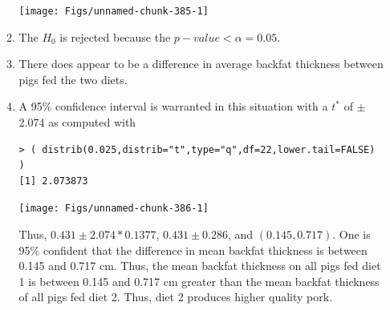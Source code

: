 \documentclass[10pt,openany]{book}\usepackage[]{graphicx}\usepackage[]{color}
\makeatletter
\newenvironment{kframe}{%
 \def\at@end@of@kframe{}%
 \ifinner\ifhmode%
  \def\at@end@of@kframe{\end{minipage}}%
  \begin{minipage}{\columnwidth}%
 \fi\fi%
 \def\FrameCommand##1{\hskip\@totalleftmargin \hskip-\fboxsep
 \colorbox{shadecolor}{##1}\hskip-\fboxsep
     \hskip-\linewidth \hskip-\@totalleftmargin \hskip\columnwidth}%
 \MakeFramed {\advance\hsize-\width
   \@totalleftmargin\z@ \linewidth\hsize
   \@setminipage}}%
 {\par\unskip\endMakeFramed%
 \at@end@of@kframe}
\newenvironment{knitrout}{}{} %
\makeatother
\begin{document}
\begin{itemize}
\begin{enumerate}
\begin{knitrout}
{\centering \texttt{[image: Figs/unnamed-chunk-385-1]} 

}



\end{knitrout}
      \item The $H_{0}$ is rejected because the $p-value <\alpha=0.05$.
      \item There does appear to be a difference in average backfat thickness between pigs fed the two diets.
      \item A 95\% confidence interval is warranted in this situation with a $t^{*}$ of $\pm$2.074 as computed with
\begin{knitrout}
\color{fgcolor}\begin{kframe}
\begin{verbatim}
> ( distrib(0.025,distrib="t",type="q",df=22,lower.tail=FALSE) )
[1] 2.073873
\end{verbatim}
\end{kframe}

{\centering \texttt{[image: Figs/unnamed-chunk-386-1]} 

}



\end{knitrout}
Thus, $0.431\pm2.074*0.1377$, $0.431\pm0.286$, and $(0.145,0.717)$.  One is 95\% confident that the difference in mean backfat thickness is between 0.145 and 0.717 cm.  Thus, the mean backfat thickness on all pigs fed diet 1 is between 0.145 and 0.717 cm greater than the mean backfat thickness of all pigs fed diet 2.  Thus, diet 2 produces higher quality pork.
    \end{enumerate}


\end{itemize}
\end{document}
